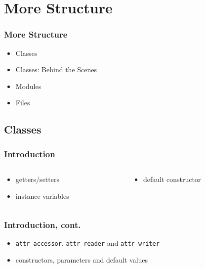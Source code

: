 


\section{More Structure} 
\begin{frame}\frametitle{More Structure} 
\begin{itemize}
\item Classes
\item Classes: Behind the Scenes
\item Modules
\item Files
\end{itemize}
\end{frame}



\subsection{Classes}
\begin{frame}[fragile]\frametitle{Introduction}


\pause

\begin{columns}[c] 

\begin{column}{5.5cm}

\begin{itemize}
\item getters/setters
\item instance variables
\end{itemize}

\end{column}

\begin{column}{5.5cm}

\begin{itemize}
\item default constructor
\end{itemize}

\end{column}

\end{columns}

\end{frame}



\begin{frame}[fragile]\frametitle{Introduction, cont.}


\pause

\begin{itemize}
\item \texttt{attr\_accessor}, \texttt{attr\_reader} and \texttt{attr\_writer}

\item constructors, parameters and default values
\end{itemize}

\end{frame}



